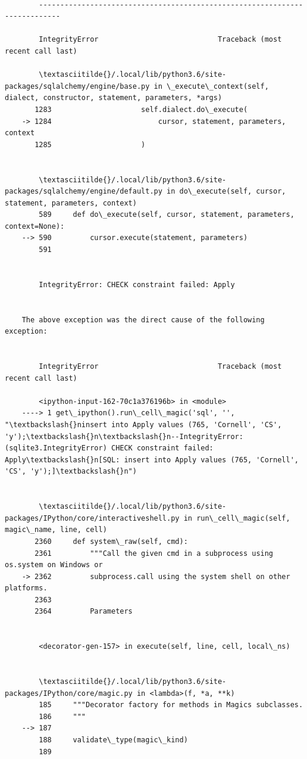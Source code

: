 \documentclass[11pt]{article}
\begin{document}
    \begin{Verbatim}[commandchars=\\\{\}]

        ---------------------------------------------------------------------------

        IntegrityError                            Traceback (most recent call last)

        \textasciitilde{}/.local/lib/python3.6/site-packages/sqlalchemy/engine/base.py in \_execute\_context(self, dialect, constructor, statement, parameters, *args)
       1283                     self.dialect.do\_execute(
    -> 1284                         cursor, statement, parameters, context
       1285                     )


        \textasciitilde{}/.local/lib/python3.6/site-packages/sqlalchemy/engine/default.py in do\_execute(self, cursor, statement, parameters, context)
        589     def do\_execute(self, cursor, statement, parameters, context=None):
    --> 590         cursor.execute(statement, parameters)
        591 


        IntegrityError: CHECK constraint failed: Apply

        
    The above exception was the direct cause of the following exception:


        IntegrityError                            Traceback (most recent call last)

        <ipython-input-162-70c1a376196b> in <module>
    ----> 1 get\_ipython().run\_cell\_magic('sql', '', "\textbackslash{}ninsert into Apply values (765, 'Cornell', 'CS', 'y');\textbackslash{}n\textbackslash{}n--IntegrityError: (sqlite3.IntegrityError) CHECK constraint failed: Apply\textbackslash{}n[SQL: insert into Apply values (765, 'Cornell', 'CS', 'y');]\textbackslash{}n")
    

        \textasciitilde{}/.local/lib/python3.6/site-packages/IPython/core/interactiveshell.py in run\_cell\_magic(self, magic\_name, line, cell)
       2360     def system\_raw(self, cmd):
       2361         """Call the given cmd in a subprocess using os.system on Windows or
    -> 2362         subprocess.call using the system shell on other platforms.
       2363 
       2364         Parameters


        <decorator-gen-157> in execute(self, line, cell, local\_ns)


        \textasciitilde{}/.local/lib/python3.6/site-packages/IPython/core/magic.py in <lambda>(f, *a, **k)
        185     """Decorator factory for methods in Magics subclasses.
        186     """
    --> 187 
        188     validate\_type(magic\_kind)
        189 



\end{Verbatim}
\end{document}
